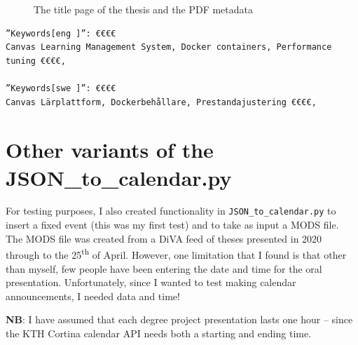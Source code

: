 \begin{figure}[!ht]
  \begin{center}
  \end{center}
  \caption{The title page of the thesis and the PDF metadata}
  \label{fig:pdfMetadata}
\end{figure}
\FloatBarrier	
{}
\begin{lstlisting}[language={[LaTeX]TeX}, caption={The keywords appear as expected in the For DiVA data at the end of the PDF file}, label=lst:keywordsFromForDIVA]	
”Keywords[eng ]”: €€€€
Canvas Learning Management System, Docker containers, Performance tuning €€€€,

”Keywords[swe ]”: €€€€
Canvas Lärplattform, Dockerbehållare, Prestandajustering €€€€,
\end{lstlisting}

\section{Other variants of the JSON\_to\_calendar.py}
\label{sec:otherVariantsofJSONtoCalendar}
For testing purposes, I also created functionality in \texttt{JSON\_to\_calendar.py} to insert a fixed event (this was my first test) and to take as input a MODS file. The MODS file was created from a DiVA feed of theses presented in 2020 through to the 25\textsuperscript{th} of April. However, one limitation that I found is that other than myself, few people have been entering the date and time for the oral presentation. Unfortunately, since I wanted to test making calendar announcements, I needed data and time!

\textbf{NB}: I have assumed that each degree project presentation lasts one hour – since the KTH Cortina calendar API needs both a starting and ending time.

